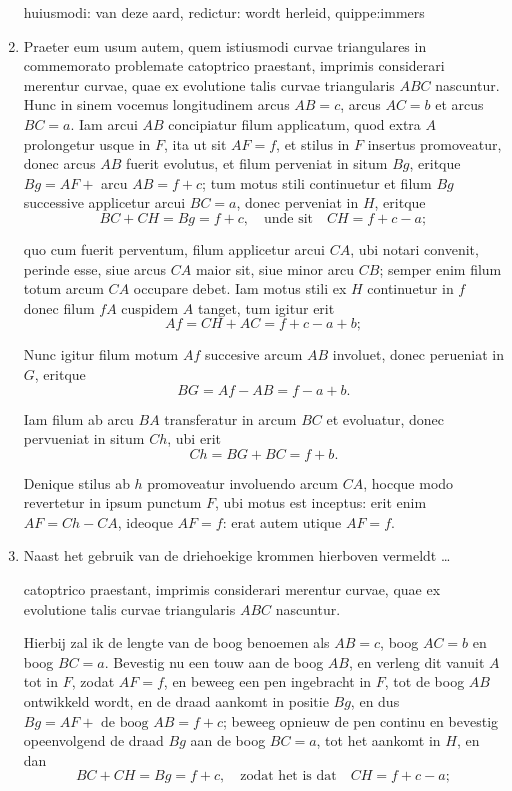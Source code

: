\documentclass[10pt,a4paper]{article}
\newcommand{\switchenum}{\setcounter{enumi}{\arabic{enumi}-1}\switchcolumn}
\begin{document}
\begin{paracol}{2}
\begin{enumerate}[topsep=1px]
		\par huiusmodi: van deze aard, redictur: wordt herleid, quippe:immers
		\switchcolumn*
		
		\item Praeter eum usum autem, quem istiusmodi curvae triangulares in commemorato problemate catoptrico praestant, imprimis considerari merentur curvae, quae ex evolutione talis curvae triangularis $A B C$ nascuntur. Hunc in sinem vocemus longitudinem arcus $A B = c$, arcus $AC=b$ et arcus $BC=a$. Iam arcui $AB$ concipiatur filum applicatum, quod extra $A$ prolongetur usque in $F$, ita ut sit $AF=f$, et stilus in $F$ insertus promoveatur, donec arcus $AB$ fuerit evolutus, et filum perveniat in situm $Bg$, eritque $Bg = AF +$ arcu $AB = f+c$; tum motus stili continuetur et filum $Bg$ successive applicetur arcui $BC=a$, donec perveniat in $H$, eritque 
		\[
			BC+CH = Bg = f+c, \quad \text{unde sit} \quad CH = f+c-a;
		\]
		\par quo cum fuerit perventum, filum applicetur arcui $CA$, ubi notari convenit, perinde esse, siue arcus $CA$ maior sit, siue minor arcu $CB$; semper enim filum totum arcum $CA$ occupare debet. Iam motus stili ex $H$ continuetur in $f$ donec filum $fA$ cuspidem $A$ tanget, tum igitur erit 
		\[
			Af = CH + AC = f+c-a+b;
		\]
		\par Nunc igitur filum motum $Af$ succesive arcum $AB$ involuet, donec perueniat in $G$, eritque
		\[
			BG = Af - AB = f-a+b.
		\]
		\par Iam filum ab arcu $BA$ transferatur in arcum $BC$ et evoluatur, donec pervueniat in situm $Ch$, ubi erit
		\[
			Ch = BG + BC = f+b.
		\]
		\par Denique stilus ab $h$ promoveatur involuendo arcum $CA$, hocque modo revertetur in ipsum punctum $F$, ubi motus est inceptus: erit enim $AF = Ch-CA$, ideoque $AF=f$: erat autem utique $AF =f$.
		
		\switchenum
		\item Naast het gebruik van de driehoekige krommen hierboven vermeldt \ldots 
		\par catoptrico praestant, imprimis considerari merentur curvae, quae ex evolutione talis curvae triangularis $A B C$ nascuntur. 
		\par Hierbij zal ik de lengte van de boog benoemen als $AB = c$, boog $AC=b$ en boog $BC=a$. Bevestig nu een touw aan de boog $AB$, en verleng dit vanuit $A$ tot in $F$, zodat $AF=f$, en beweeg een pen ingebracht in $F$, tot de boog $AB$ ontwikkeld wordt, en de draad aankomt in positie $Bg$, en dus $Bg = AF + \text{ de boog } AB = f+c$; beweeg opnieuw de pen continu en bevestig opeenvolgend de draad $Bg$ aan de boog $BC=a$, tot het aankomt in $H$, en dan
		\[
			BC+CH = Bg = f+c, \quad \text{zodat het is dat} \quad CH = f+c-a;
		\]
		

\end{enumerate}
\end{paracol}
\end{document}
